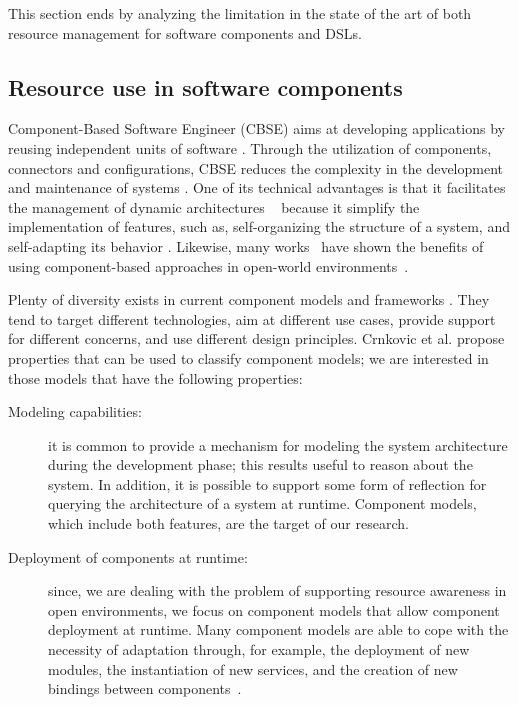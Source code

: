 This section ends by analyzing the limitation in the state of the art of both resource management for software components and DSLs. 

\subsection{Resource use in software components} \label{sec:components-oriented-resource-awareness}

Component-Based Software Engineer (CBSE) aims at developing applications by reusing independent units of software \cite{cbse-conference, Crnkovic2011}.
Through the utilization of components, connectors and configurations, CBSE reduces the complexity in the development and maintenance of systems \cite{xadl,Medvidovic:2000,VanOmmering-et-al-00}.
One of its technical advantages is that it facilitates the management of dynamic architectures
~\cite{DBLP:journals/ase/NittoGMPP08, Johnson:2015:CSM:2735960.2735979}
because it simplify the implementation of features, such as, self-organizing the structure of a system, and self-adapting its behavior
\cite{PanzicaLaManna:2012:LDU:2304736.2304764, Johnson:2015:CSM:2735960.2735979,Zhang:2009:MVD:1509239.1509262}.
Likewise, many works~\cite{cbse-conference} have shown the benefits of using component-based approaches in open-world environments~\cite{baresi2006toward, Caporuscio:2010:AIA:1985522.1985547, Perez-Palacin:2010:PAO:1712605.1712614}.

Plenty of diversity exists in current component models and frameworks \cite{Heineman2001, SZYPERSKI2002, Crnkovic2011}.
They tend to target different technologies, aim at different use cases, provide support for different concerns, and use different design principles.
Crnkovic et al. \cite{Crnkovic2011} propose properties that can be used to classify component models; we are interested in those models that have the following properties:

\begin{description}
\item[Modeling capabilities:] it is common to provide a mechanism for modeling the system architecture during the development phase; this results useful to reason about the system.
In addition, it is possible to support some form of reflection for querying the architecture of a system at runtime.
Component models, which include both features, are the target of our research.

\item[Deployment of components at runtime:] since, we are dealing with the problem of supporting resource awareness in open environments, we focus on component models that allow component deployment at runtime.
Many component models are able to cope with the necessity of adaptation through, for example, the deployment of new modules, the instantiation of new services, and the creation of new bindings between components~\cite{Porter:2014:RMC:2602458.2602471, Zheng:2014:RCC:2679601.2680405, Irmert:2008:RAS:1370018.1370036, Ghezzi:2010:QDD:2163764.2163774}.
\end{description}

